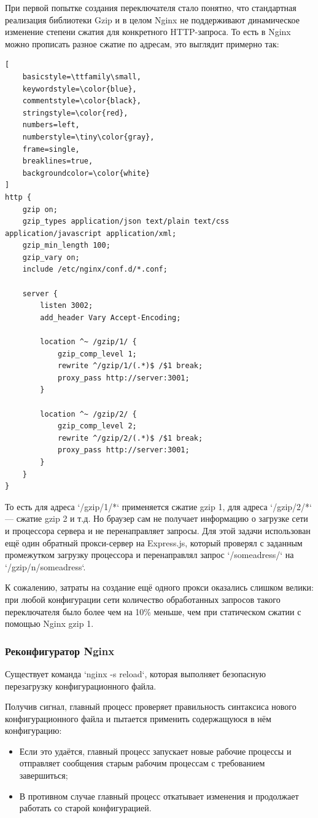 \documentclass[12pt]{article}
\begin{document}
При первой попытке создания переключателя стало понятно, что стандартная реализация библиотеки Gzip и в целом Nginx не поддерживают
динамическое изменение степени сжатия для конкретного HTTP-запроса. То есть в Nginx можно прописать разное сжатие по адресам, это выглядит примерно так:

\begin{lstlisting}[
    basicstyle=\ttfamily\small,
    keywordstyle=\color{blue},
    commentstyle=\color{black},
    stringstyle=\color{red},
    numbers=left,
    numberstyle=\tiny\color{gray},
    frame=single,
    breaklines=true,
    backgroundcolor=\color{white}
]
http {
    gzip on;
    gzip_types application/json text/plain text/css application/javascript application/xml;
    gzip_min_length 100;
    gzip_vary on;
    include /etc/nginx/conf.d/*.conf;

    server {
        listen 3002;
        add_header Vary Accept-Encoding;

        location ^~ /gzip/1/ {
            gzip_comp_level 1;
            rewrite ^/gzip/1/(.*)$ /$1 break;
            proxy_pass http://server:3001;
        }

        location ^~ /gzip/2/ {
            gzip_comp_level 2;
            rewrite ^/gzip/2/(.*)$ /$1 break;
            proxy_pass http://server:3001;
        }
    }
}
\end{lstlisting}

То есть для адреса `/gzip/1/*` применяется сжатие gzip 1, для адреса `/gzip/2/*` — сжатие gzip 2 и т.д.
Но браузер сам не получает информацию о загрузке сети и процессора сервера и не перенаправляет запросы.
Для этой задачи использован ещё один обратный прокси-сервер на Express.js, который проверял
с заданным промежутком загрузку процессора и перенаправлял запрос `/someadress/` на `/gzip/n/someadress`.

К сожалению, затраты на создание ещё одного прокси оказались слишком велики: при любой конфигурации сети
количество обработанных запросов такого переключателя было более чем на 10\% меньше, чем при статическом сжатии с помощью Nginx gzip 1.

\subsubsection{Реконфигуратор Nginx}

Существует команда `nginx -s reload`, которая выполняет безопасную перезагрузку конфигурационного файла.

Получив сигнал, главный процесс проверяет правильность синтаксиса нового конфигурационного файла и пытается применить содержащуюся в нём конфигурацию:
\begin{itemize}
    \item Если это удаётся, главный процесс запускает новые рабочие процессы и отправляет сообщения старым рабочим процессам с требованием завершиться;
    \item В противном случае главный процесс откатывает изменения и продолжает работать со старой конфигурацией.
\end{itemize}
\end{document}
